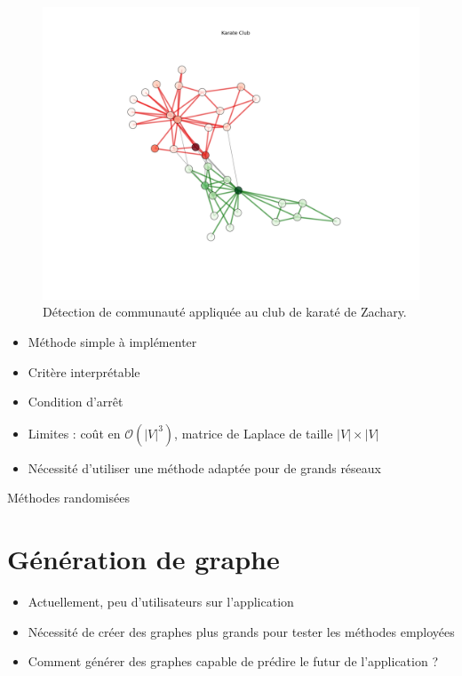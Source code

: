 \documentclass[c]{beamer}
\begin{document}
\begin{frame}
    \begin{figure}
        \includegraphics[width=.8\textwidth]{./karate_club_split.png}
        \caption{Détection de communauté appliquée au club de karaté de
        Zachary.}
    \end{figure}
\end{frame}

\begin{frame}
    \begin{itemize}
        \item Méthode simple à implémenter
        \item Critère interprétable
        \item Condition d'arrêt
        \item Limites : coût en $\mathcal{O} (|V|^3)$, matrice de Laplace de
            taille $|V| \times |V|$
        \item Nécessité d'utiliser une méthode adaptée pour de grands réseaux
    \end{itemize}
\end{frame}

\begin{frame}
    Méthodes randomisées
\end{frame}

\section{Génération de graphe}

\begin{frame}
    \begin{itemize}
        \item Actuellement, peu d'utilisateurs sur l'application
        \item Nécessité de créer des graphes plus grands pour tester les
            méthodes employées
        \item Comment générer des graphes capable de \og prédire \fg{} le
            futur de l'application ?
    \end{itemize}
\end{frame}
\end{document}
